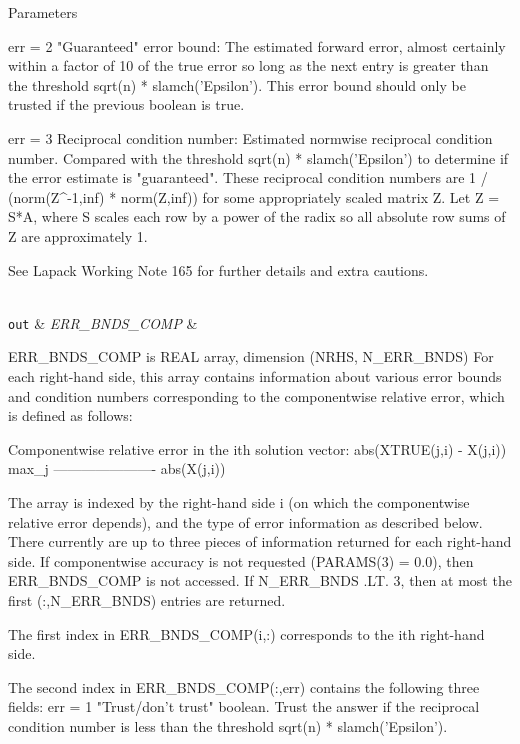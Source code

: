 \begin{DoxyParams}[1]{Parameters}
\begin{DoxyVerb}
     err = 2 "Guaranteed" error bound: The estimated forward error,
              almost certainly within a factor of 10 of the true error
              so long as the next entry is greater than the threshold
              sqrt(n) * slamch('Epsilon'). This error bound should only
              be trusted if the previous boolean is true.

     err = 3  Reciprocal condition number: Estimated normwise
              reciprocal condition number.  Compared with the threshold
              sqrt(n) * slamch('Epsilon') to determine if the error
              estimate is "guaranteed". These reciprocal condition
              numbers are 1 / (norm(Z^{-1},inf) * norm(Z,inf)) for some
              appropriately scaled matrix Z.
              Let Z = S*A, where S scales each row by a power of the
              radix so all absolute row sums of Z are approximately 1.

     See Lapack Working Note 165 for further details and extra
     cautions.\end{DoxyVerb}
\\
\hline
\mbox{\tt out}  & {\em E\+R\+R\+\_\+\+B\+N\+D\+S\+\_\+\+C\+O\+M\+P} & \begin{DoxyVerb}          ERR_BNDS_COMP is REAL array, dimension (NRHS, N_ERR_BNDS)
     For each right-hand side, this array contains information about
     various error bounds and condition numbers corresponding to the
     componentwise relative error, which is defined as follows:

     Componentwise relative error in the ith solution vector:
                    abs(XTRUE(j,i) - X(j,i))
             max_j ----------------------
                         abs(X(j,i))

     The array is indexed by the right-hand side i (on which the
     componentwise relative error depends), and the type of error
     information as described below. There currently are up to three
     pieces of information returned for each right-hand side. If
     componentwise accuracy is not requested (PARAMS(3) = 0.0), then
     ERR_BNDS_COMP is not accessed.  If N_ERR_BNDS .LT. 3, then at most
     the first (:,N_ERR_BNDS) entries are returned.

     The first index in ERR_BNDS_COMP(i,:) corresponds to the ith
     right-hand side.

     The second index in ERR_BNDS_COMP(:,err) contains the following
     three fields:
     err = 1 "Trust/don't trust" boolean. Trust the answer if the
              reciprocal condition number is less than the threshold
              sqrt(n) * slamch('Epsilon').


\end{DoxyVerb}
\end{DoxyParams}
